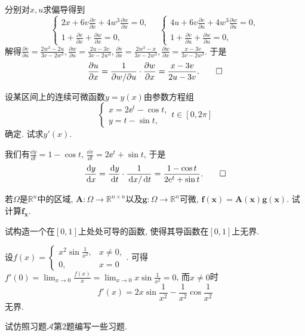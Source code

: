\begin{quiza}
\begin{solution}
分别对\(x,u\)求偏导得到\[\begin{cases}
2x+6v\frac{\partial v}{\partial x}+4w^3\frac{\partial w}{\partial x}=0,\\
1+\frac{\partial v}{\partial x}+\frac{\partial w}{\partial x}=0,
\end{cases}\quad\begin{cases}
4u+6v\frac{\partial v}{\partial u}+4w^3\frac{\partial w}{\partial u}=0,\\
1+\frac{\partial v}{\partial u}+\frac{\partial w}{\partial u}=0,
\end{cases}\]解得\(\frac{\partial v}{\partial u}=\frac{2w^3-2u}{3v-2w^3},\frac{\partial w}{\partial u}=\frac{2u-3v}{3v-2w^3},\frac{\partial v}{\partial x}=\frac{2w^3-x}{3v-2w^3},\frac{\partial w}{\partial x}=\frac{x-3v}{3v-2w^3}.\) 于是\[\frac{\partial u}{\partial x}=\frac{1}{\partial w/\partial u}\cdot\frac{\partial w}{\partial x}=\frac{x-3v}{2u-3v}.\qedhere\]
\end{solution}
\woe 设某区间上的连续可微函数\(y=y(x)\)由参数方程组\[\begin{cases}
    x=2\ee^t-\cos t,\\ y=t-\sin t,
\end{cases}t\in [0,2\pi]\]确定. 试求\(y'(x)\).
\begin{solution}
我们有\(\frac{\dd y}{\dd t}=1-\cos t,\,\frac{\dd x}{\dd t}=2\ee^t+\sin t\), 于是\[\frac{\,\mathrm{d} y}{\,\mathrm{d} x}=\frac{\,\mathrm{d} y}{\,\mathrm{d} t}\cdot\frac{1}{\,\mathrm{d} x/\,\mathrm{d} t}=\frac{1-\cos t}{2\mathrm{e}^t+\sin t}.\qedhere\]
\end{solution}
\end{quiza}
\begin{quizb}
\woe 若\(\Omega\)是\(\mathbb{R}^n\)中的区域, \(\boldsymbol{A}:\Omega\rightarrow\mathbb{R}^{n\times n}\)以及\(\boldsymbol{g}:\Omega\rightarrow\mathbb{R}^n\)可微, \(\boldsymbol{f}(\boldsymbol{x})=\boldsymbol{A}(\boldsymbol{x})\boldsymbol{g}(\boldsymbol{x})\). 试计算\(\boldsymbol{f_x}\).
\begin{solution}

\end{solution}
\woe 试构造一个在\([0,1]\)上处处可导的函数, 使得其导函数在\([0,1]\)上无界.
\begin{solution}
设\(f(x)=\begin{cases}
x^2\sin\frac{1}{x^2},&x\ne 0,\\
0,&x=0
\end{cases}\). 可得\(f'(0)=\lim_{x\rightarrow 0}\frac{f(x)}{x}=\lim_{x\rightarrow 0}x\sin\frac{1}{x^2}=0\), 而\(x\ne 0\)时\[f'(x)=2x\sin\frac{1}{x^2}-\frac{1}{x^2}\cos\frac{1}{x^2}\]无界.
\end{solution}

\woe 试仿照习题\(\boldsymbol{\mathcal{A}}\)第2题编写一些习题.
\end{quizb}
